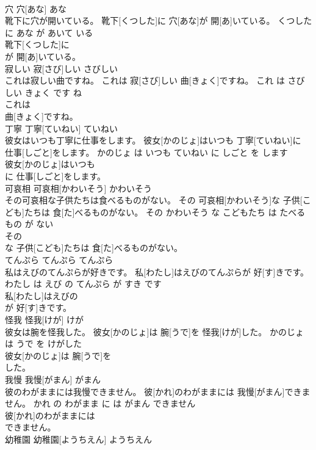 \documentclass[8pt]{extreport}
\begin{document}
\begin{CJK}{UTF8}{min}
\\	穴	穴[あな]	あな	
\\	靴下に穴が開いている。	靴下[くつした]に 穴[あな]が 開[あ]いている。	くつした に あな が あいて いる	
\\	靴下[くつした]に
\\	が 開[あ]いている。			
\\	寂しい	寂[さび]しい	さびしい	
\\	これは寂しい曲ですね。	これは 寂[さび]しい 曲[きょく]ですね。	これ は さびしい きょく です ね	
\\	これは
\\	曲[きょく]ですね。			
\\	丁寧	丁寧[ていねい]	ていねい	
\\	彼女はいつも丁寧に仕事をします。	彼女[かのじょ]はいつも 丁寧[ていねい]に 仕事[しごと]をします。	かのじょ は いつも ていねい に しごと を します	
\\	彼女[かのじょ]はいつも
\\	に 仕事[しごと]をします。			
\\	可哀相	可哀相[かわいそう]	かわいそう	
\\	その可哀相な子供たちは食べるものがない。	その 可哀相[かわいそう]な 子供[こども]たちは 食[た]べるものがない。	その かわいそう な こどもたち は たべる もの が ない	
\\	その
\\	な 子供[こども]たちは 食[た]べるものがない。			
\\	てんぷら	てんぷら	てんぷら	
\\	私はえびのてんぷらが好きです。	私[わたし]はえびのてんぷらが 好[す]きです。	わたし は えび の てんぷら が すき です	
\\	私[わたし]はえびの
\\	が 好[す]きです。			
\\	怪我	怪我[けが]	けが	
\\	彼女は腕を怪我した。	彼女[かのじょ]は 腕[うで]を 怪我[けが]した。	かのじょ は うで を けがした	
\\	彼女[かのじょ]は 腕[うで]を
\\	した。			
\\	我慢	我慢[がまん]	がまん	
\\	彼のわがままには我慢できません。	彼[かれ]のわがままには 我慢[がまん]できません。	かれ の わがまま に は がまん できません	
\\	彼[かれ]のわがままには
\\	できません。			
\\	幼稚園	幼稚園[ようちえん]	ようちえん	

\end{CJK}
\end{document}
